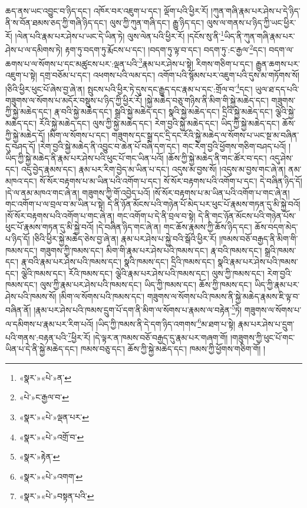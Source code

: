 ཆད་ནས་ཡང་འབྱུང་བ་ཉིད་དང་། འཁོར་བར་འཇུག་པ་དང་། ལྡོག་པའི་ཕྱིར་རོ། །ཀུན་གཞི་རྣམ་པར་ཤེས་པ་དེ་ཉིད་ནི་ས་བོན་ཐམས་ཅད་ཀྱི་གཞི་ཉིད་དང་། ལུས་ཀྱི་ཀུན་གཞི་དང་། རྒྱུ་ཉིད་དང་། ལུས་ལ་གནས་པ་ཉིད་ཀྱི་ཡང་ཕྱིར་རོ། །ལེན་པའི་རྣམ་པར་ཤེས་པ་ཡང་དེ་ཡིན་ཏེ། ལུས་ལེན་པའི་ཕྱིར་རོ། །དངོས་སུ་ནི་\footnote{«སྣར་»«པེ་»ན་}ཡིད་ནི་ཀུན་གཞི་རྣམ་པར་ཤེས་པ་ལ་དམིགས་ཏེ། རྟག་ཏུ་བདག་ཏུ་རྨོངས་པ་དང་། །བདག་ཏུ་ལྟ་བ་དང་། བདག་ཏུ་:ང་རྒྱལ་\footnote{«པེ་»ང་རྒྱལ་བ་}དང་། བདག་ལ་ཆགས་པ་ལ་སོགས་པ་དང་མཚུངས་པར་:ལྡན་པའི་\footnote{«སྣར་»«པེ་»ལྡན་པར་}རྣམ་པར་ཤེས་པ་སྟེ། རིགས་གཅིག་པ་དང་། རྒྱུན་ཆགས་པར་འཇུག་པ་སྟེ། དགྲ་བཅོམ་པ་དང་། འཕགས་པའི་ལམ་དང་། འགོག་པའི་སྙོམས་པར་འཇུག་པའི་དུས་མ་གཏོགས་སོ། །ཅིའི་ཕྱིར་ཕུང་པོ་ཞེས་བྱ་ཞེ་ན། སྤུངས་པའི་ཕྱིར་ཏེ་དུས་དང་རྒྱུད་དང་རྣམ་པ་དང་:གྲོལ་བ་\footnote{«སྣར་»«པེ་»འགྲོ་བ་}དང་། ཡུལ་ཐ་དད་པའི་གཟུགས་ལ་སོགས་པ་མདོར་བསྡུས་པ་ཉིད་ཀྱི་ཕྱིར་རོ། །སྐྱེ་མཆེད་བཅུ་གཉིས་ནི་མིག་གི་སྐྱེ་མཆེད་དང་། གཟུགས་ཀྱི་སྐྱེ་མཆེད་དང་། རྣ་བའི་སྐྱེ་མཆེད་དང་། སྒྲའི་སྐྱེ་མཆེད་དང་། སྣའི་སྐྱེ་མཆེད་དང་། དྲིའི་སྐྱེ་མཆེད་དང་། ལྕེའི་སྐྱེ་མཆེད་དང་། རོའི་སྐྱེ་མཆེད་དང་། ལུས་ཀྱི་སྐྱེ་མཆེད་དང་། རེག་བྱའི་སྐྱེ་མཆེད་དང་། ཡིད་ཀྱི་སྐྱེ་མཆེད་དང་། ཆོས་ཀྱི་སྐྱེ་མཆེད་དོ། །མིག་ལ་སོགས་པ་དང་། གཟུགས་དང་སྒྲ་དང་དྲི་དང་རོའི་སྐྱེ་མཆེད་ལ་སོགས་པ་ཡང་སྔ་མ་བཞིན་དུ་བཤད་དོ། །རེག་བྱའི་སྐྱེ་མཆེད་ནི་འབྱུང་བ་ཆེན་པོ་བཞི་དག་དང་། གང་རེག་བྱའི་ཕྱོགས་གཅིག་བཤད་པའོ། །ཡིད་ཀྱི་སྐྱེ་མཆེད་ནི་རྣམ་པར་ཤེས་པའི་ཕུང་པོ་གང་ཡིན་པའོ། །ཆོས་ཀྱི་སྐྱེ་མཆེད་ནི་གང་ཚོར་བ་དང་། འདུ་ཤེས་དང་། འདུ་བྱེད་རྣམས་དང་། རྣམ་པར་རིག་བྱེད་མ་ཡིན་པ་དང་། འདུས་མ་བྱས་སོ། །འདུས་མ་བྱས་གང་ཞེ་ན། ནམ་མཁའ་དང་། སོ་སོར་བརྟགས་པ་མ་ཡིན་པའི་འགོག་པ་དང་། སོ་སོར་བརྟགས་པའི་འགོག་པ་དང་། དེ་བཞིན་ཉིད་དོ། །དེ་ལ་ནམ་མཁའ་གང་ཞེ་ན། གཟུགས་ཀྱི་གོ་འབྱེད་པའོ། །སོ་སོར་བརྟགས་པ་མ་ཡིན་པའི་འགོག་པ་གང་ཞེ་ན། གང་འགོག་པ་ལ་བྲལ་བ་མ་ཡིན་པ་སྟེ། དེ་ནི་ཉོན་མོངས་པའི་གཉེན་པོ་མེད་པར་ཕུང་པོ་རྣམས་གཏན་དུ་མི་སྐྱེ་བའོ། །སོ་སོར་བརྟགས་པའི་འགོག་པ་གང་ཞེ་ན། གང་འགོག་པ་དེ་ནི་བྲལ་བ་སྟེ། དེ་ནི་གང་ཉོན་མོངས་པའི་གཉེན་པོས་ཕུང་པོ་རྣམས་གཏན་དུ་མི་སྐྱེ་བའོ། །དེ་བཞིན་ཉིད་གང་ཞེ་ན། གང་ཆོས་རྣམས་ཀྱི་ཆོས་ཉིད་དང་། ཆོས་བདག་མེད་པ་ཉིད་དོ། །ཅིའི་ཕྱིར་སྐྱེ་མཆེད་ཅེས་བྱ་ཞེ་ན། རྣམ་པར་ཤེས་པ་སྐྱེ་བའི་སྒོའི་ཕྱིར་རོ། །ཁམས་བཅོ་བརྒྱད་ནི་མིག་གི་ཁམས་དང་། གཟུགས་ཀྱི་ཁམས་དང་། མིག་གི་རྣམ་པར་ཤེས་པའི་ཁམས་དང་། རྣ་བའི་ཁམས་དང་། སྒྲའི་ཁམས་དང་། རྣ་བའི་རྣམ་པར་ཤེས་པའི་ཁམས་དང་། སྣའི་ཁམས་དང་། དྲིའི་ཁམས་དང་། སྣའི་རྣམ་པར་ཤེས་པའི་ཁམས་དང་། ལྕེའི་ཁམས་དང་། རོའི་ཁམས་དང་། ལྕེའི་རྣམ་པར་ཤེས་པའི་ཁམས་དང་། ལུས་ཀྱི་ཁམས་དང་། རེག་བྱའི་ཁམས་དང་། ལུས་ཀྱི་རྣམ་པར་ཤེས་པའི་ཁམས་དང་། ཡིད་ཀྱི་ཁམས་དང་། ཆོས་ཀྱི་ཁམས་དང་། ཡིད་ཀྱི་རྣམ་པར་ཤེས་པའི་ཁམས་སོ། །མིག་ལ་སོགས་པའི་ཁམས་དང་། གཟུགས་ལ་སོགས་པའི་ཁམས་ནི་སྐྱེ་མཆེད་རྣམས་ཇི་ལྟ་བ་བཞིན་ནོ། །རྣམ་པར་ཤེས་པའི་ཁམས་དྲུག་པོ་དག་ནི་མིག་ལ་སོགས་པ་རྣམས་ལ་བརྟེན་\footnote{«སྣར་»རྟེན་}ཏེ། གཟུགས་ལ་སོགས་པ་ལ་དམིགས་པ་རྣམ་པར་རིག་པའོ། །ཡིད་ཀྱི་ཁམས་ནི་དེ་དག་ཉིད་འགགས་\footnote{«སྣར་»«པེ་»འགག་}མ་ཐག་པ་སྟེ། རྣམ་པར་ཤེས་པ་དྲུག་པའི་གནས་:བརྟན་པའི་\footnote{«སྣར་»«པེ་»བསྟན་པའི་}ཕྱིར་རོ། །དེ་ལྟར་ན་ཁམས་བཅོ་བརྒྱད་དུ་རྣམ་པར་གཞག་གོ། །གཟུགས་ཀྱི་ཕུང་པོ་གང་ཡིན་པ་དེ་ནི་སྐྱེ་མཆེད་དང་། ཁམས་བཅུ་དང་། ཆོས་ཀྱི་སྐྱེ་མཆེད་དང་། ཁམས་ཀྱི་ཕྱོགས་གཅིག་གོ། །
